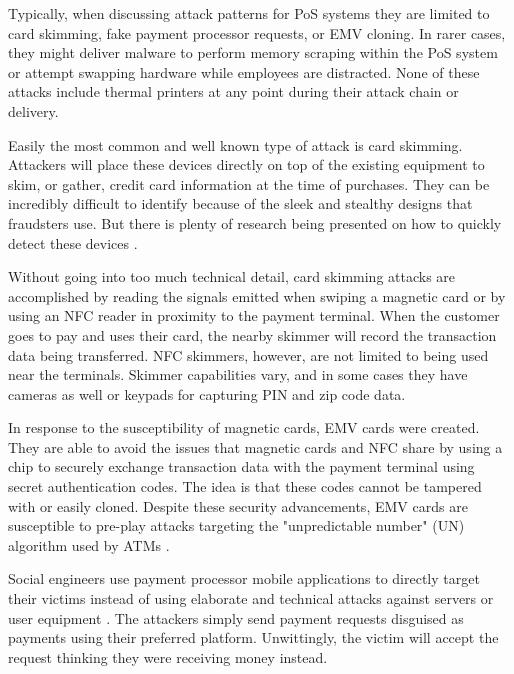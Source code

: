 Typically, when discussing attack patterns for PoS systems they are limited to card skimming, fake payment processor requests, or EMV cloning. In rarer cases, they might deliver malware to perform memory scraping within the PoS system or attempt swapping hardware while employees are distracted. None of these attacks include thermal printers at any point during their attack chain or delivery.


Easily the most common and well known type of attack is card skimming. Attackers will place these devices directly on top of the existing equipment to skim, or gather, credit card information at the time of purchases. They can be incredibly difficult to identify because of the sleek and stealthy designs that fraudsters use. But there is plenty of research being presented on how to quickly detect these devices \autocite{scaifeFearReaperCharacterization2018,scaifeKissRogueEvaluating2019a}.

Without going into too much technical detail, card skimming attacks are accomplished by reading the signals emitted when swiping a magnetic card or by using an NFC reader in proximity to the payment terminal. When the customer goes to pay and uses their card, the nearby skimmer will record the transaction data being transferred. NFC skimmers, however, are not limited to being used near the terminals. Skimmer capabilities vary, and in some cases they have cameras as well or keypads for capturing PIN and zip code data.

In response to the susceptibility of magnetic cards, EMV cards were created. They are able to avoid the issues that magnetic cards and NFC share by using a chip to securely exchange transaction data with the payment terminal using secret authentication codes. The idea is that these codes cannot be tampered with or easily cloned. Despite these security advancements, EMV cards are susceptible to pre-play attacks targeting the "unpredictable number" (UN) algorithm used by ATMs \autocite{bondChipSkimCloning2014}.



\autocite{wangMobilePaymentSecurity2016}

Social engineers use payment processor mobile applications to directly target their victims instead of using elaborate and technical attacks against servers or user equipment \autocite{bejuFraudsBankingSystem2023}. The attackers simply send payment requests disguised as payments using their preferred platform. Unwittingly, the victim will accept the request thinking they were receiving money instead.

